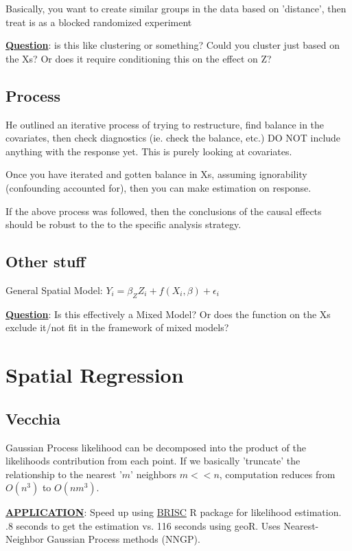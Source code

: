 \documentclass{article}
\begin{document}
Basically, you want to create similar groups in the data based on 'distance', then treat is as a blocked randomized experiment

\underline{\textbf{Question}}: is this like clustering or something? Could you cluster just based on the Xs? Or does it require conditioning this on the effect on Z?


\subsection{Process}

He outlined an iterative process of trying to restructure, find balance in the covariates, then check diagnostics (ie. check the balance, etc.) DO NOT include anything with the response yet. This is purely looking at covariates. 

Once you have iterated and gotten balance in Xs, assuming ignorability (confounding accounted for), then you can make estimation on response. 

If the above process was followed, then the conclusions of the causal effects should be robust to the to the specific analysis strategy. 

\subsection{Other stuff}

General Spatial Model: $Y_i = \beta_Z Z_i + f(X_i, \beta) + \epsilon_i$

\underline{\textbf{Question}}: Is this effectively a Mixed Model? Or does the function on the Xs exclude it/not fit in the framework of mixed models?


\section{Spatial Regression}

\subsection{Vecchia}

Gaussian Process likelihood can be decomposed into the product of the likelihoods contribution from each point. If we basically 'truncate' the relationship to the nearest '$m$' neighbors $m<<n$, computation reduces from $O(n^3)$ to $O(nm^3)$.

\underline{\textbf{APPLICATION}}: Speed up using \href{https://cran.r-project.org/web/packages/BRISC/index.html}{BRISC} R package for likelihood estimation. .8 seconds to get the estimation vs. 116 seconds using geoR. Uses Nearest-Neighbor Gaussian Process methods (NNGP).
\end{document}
